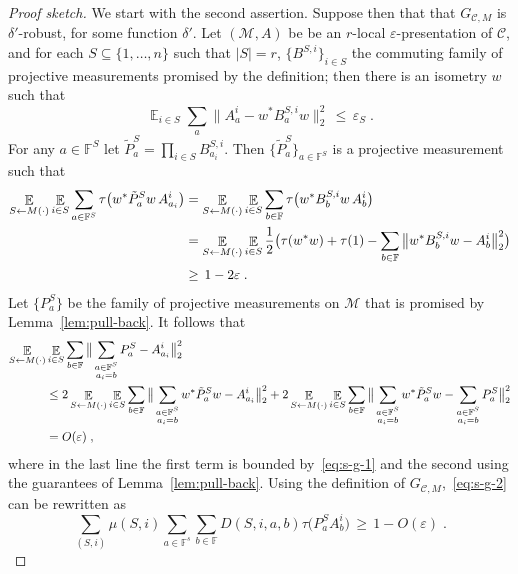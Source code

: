 \documentclass[11pt]{article}
\theoremstyle{definition}
\newcommand{\code}{\mathcal{C}}
\DeclareMathOperator*{\Expectation}{\mathbb{E}}
\newcommand{\Es}[1]{\Expectation_{#1}}
\newcommand{\field}{\mathbb{F}}
\newcommand{\mM}{\ensuremath{\mathcal{M}}}
\newcommand{\eps}{\varepsilon}
\begin{document}
\begin{proof}[Proof sketch]
We start with the second assertion. Suppose then that that $G_{\code,M}$ is $\delta'$-robust, for some function $\delta'$. Let $(\mM,A)$ be be an $r$-local $\eps$-presentation of $\code$, and for each $S\subseteq\{1,\ldots,n\}$ such that $|S|=r$, $\{B^{S,i}\}_{i\in S}$ the commuting family of projective measurements promised by the definition; then there is an isometry $w$ such that 
\[ \Es{i\in S} \sum_a \big\| A^i_a - w^* B^{S,i}_{a}w \big\|_2^2 \,\leq\,\eps_S\;.\]
 For any $a\in\field^S$ let $\tilde{P}^S_a = \prod_{i\in S} B^{S,i}_{a_i}$. Then $\{\tilde{P}^S_a\}_{a\in\field^S}$ is a projective measurement such that
\begin{align}
\Es{S\leftarrow M(\cdot)} \Es{i\in S} \sum_{a\in \field^S} \tau\big(  w^* \tilde{P}^S_a w \, A^i_{a_i}\big) 
&= \Es{S\leftarrow M(\cdot)} \Es{i\in S} \sum_{b\in \field}\tau\big(  w^* B^{S,i}_b w\, A^i_{b}\big)\notag \\
&= \Es{S\leftarrow M(\cdot)} \Es{i\in S} \frac{1}{2}\big(\tau(w^*w) + \tau(1) - \sum_{b\in \field} \big\|  w^* B^{S,i}_b w - A^i_{b}\big\|_2^2\big) \notag\\
&\geq \,1-2\eps\;.\label{eq:s-g-1}
\end{align}
Let $\{P^S_a\}$ be the family of projective measurements on $\mM$ that is promised by Lemma~\ref{lem:pull-back}. It follows that  
\begin{align}
\Es{S\leftarrow M(\cdot)} &\Es{i\in S} \sum_{b\in\field}\big\| \sum_{\substack{a\in \field^S\\a_i=b} } P^S_a - A^i_{a_i}\big\|_2^2\notag\\ 
&\leq 2\Es{S\leftarrow M(\cdot)} \Es{i\in S}\sum_{b\in\field}\big\| \sum_{\substack{a\in \field^S\\a_i=b} } w^*\tilde{P}^S_a w- A^i_{a_i}\big\|_2^2
+ 2\Es{S\leftarrow M(\cdot)} \Es{i\in S} \sum_{b\in\field}\big\| \sum_{\substack{a\in \field^S\\a_i=b} } w^*\tilde{P}^S_a w - \sum_{\substack{a\in \field^S\\a_i=b} } {P}^S_a\big\|_2^2 \notag\\
&= O(\eps)\;,\label{eq:s-g-2}
\end{align}
where in the last line the first term is bounded by~\eqref{eq:s-g-1} and the second using the guarantees of Lemma~\ref{lem:pull-back}.
Using the definition of $G_{\code,M}$,~\eqref{eq:s-g-2} can be rewritten as
\begin{equation}
 \sum_{(S,i)} \mu(S,i) \sum_{a\in \field^s}\sum_{b\in\field} D(S,i,a,b) \tau\big(  P^S_a  A^i_{b}\big) \,\geq \,1-O(\eps)\;.\label{eq:s-g-2}

\end{equation}
\end{proof}
\end{document}
